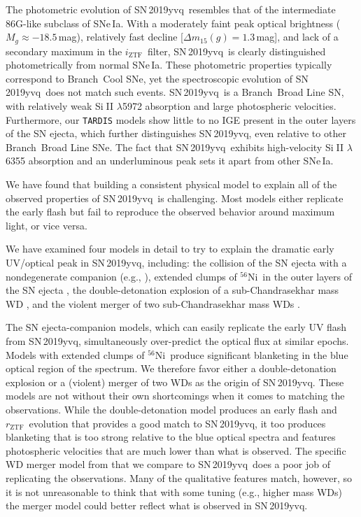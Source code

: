 \documentclass[twocolumn]{aastex63}
\def\ion#1#2{#1$\;${\footnotesize\rm{#2}}\relax}
\newcommand{\rztf}{$r_\mathrm{ZTF}$}
\newcommand{\iztf}{$i_\mathrm{ZTF}$}
\newcommand{\radni}{$^{56}$Ni}
\newcommand{\sn}{SN\,2019yvq}
\begin{document}
The photometric evolution of \sn\ resembles that of the intermediate 86G-like
subclass of SNe\,Ia. With a moderately faint peak optical brightness ($M_g
\approx -18.5$\,mag), relatively fast decline [$\Delta m_{15}(g) = 1.3$\,mag],
and lack of a secondary maximum in the \iztf\ filter, \sn\ is clearly
distinguished photometrically from normal SNe\,Ia. These photometric
properties typically correspond to Branch\ Cool SNe, yet the spectroscopic
evolution of \sn\ does not match such events. \sn\ is a Branch\ Broad Line SN,
with relatively weak \ion{Si}{II} $\lambda$5972 absorption and large
photospheric velocities. Furthermore, our \texttt{TARDIS} models show little
to no IGE present in the outer layers of the SN ejecta, which further
distinguishes \sn, even relative to other Branch~Broad Line SNe. The fact that
\sn\ exhibits high-velocity \ion{Si}{II} $\lambda$6355 absorption and an
underluminous peak sets it apart from other SNe\,Ia.

We have found that building a consistent physical model to explain all of the
observed properties of \sn\ is challenging. Most models either replicate the
early flash but fail to reproduce the observed behavior around maximum light,
or vice versa.

We have examined four models in detail to try to explain the dramatic early
UV/optical peak in \sn, including: the collision of the SN ejecta with a
nondegenerate companion (e.g., \citealt{Kasen10a}), extended clumps of \radni\
in the outer layers of the SN ejecta \citep[e.g.,][]{Magee20a}, the
double-detonation explosion of a sub-Chandrasekhar mass WD
\citep[e.g.,][]{Polin19}, and the violent merger of two sub-Chandrasekhar mass
WDs \citep[e.g.,][]{Kromer16}.

The SN ejecta-companion models, which can easily replicate the early UV flash
from \sn, simultaneously over-predict the optical flux at similar epochs.
Models with extended clumps of \radni\ produce significant blanketing in the
blue optical region of the spectrum. We therefore favor either a
double-detonation explosion or a (violent) merger of two WDs as the origin of
\sn. These models are not without their own shortcomings when it comes to
matching the observations. While the double-detonation model produces an early
flash and \rztf\ evolution that provides a good match to \sn, it too produces
blanketing that is too strong relative to the blue optical spectra and
features photospheric velocities that are much lower than what is observed.
The specific WD merger model from \citet{Kromer16} that we compare to \sn\
does a poor job of replicating the observations. Many of the qualitative
features match, however, so it is not unreasonable to think that with some
tuning (e.g., higher mass WDs) the merger model could better reflect what is
observed in \sn.
\end{document}
